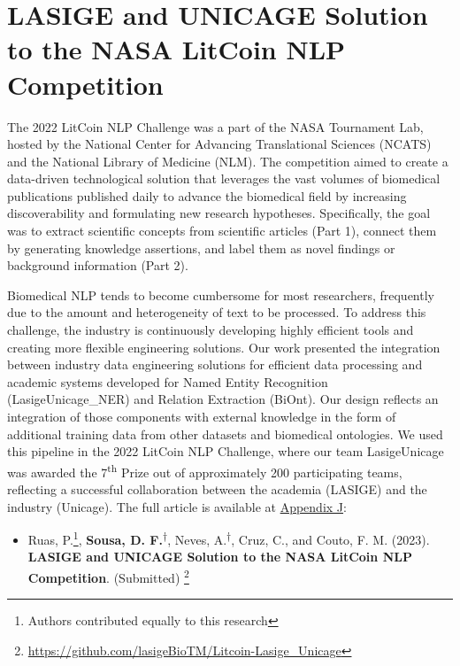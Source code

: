 \section{LASIGE and UNICAGE Solution to the NASA LitCoin NLP Competition}

The 2022 LitCoin NLP Challenge was a part of the NASA Tournament Lab, hosted by the National Center for Advancing Translational Sciences (NCATS) and the National Library of Medicine (NLM). The competition aimed to create a data-driven technological solution that leverages the vast volumes of biomedical publications published daily to advance the biomedical field by increasing discoverability and formulating new research hypotheses. Specifically, the goal was to extract scientific concepts from scientific articles (Part 1), connect them by generating knowledge assertions, and label them as novel findings or background information (Part 2). 

Biomedical NLP tends to become cumbersome for most researchers, frequently due to the amount and heterogeneity of text to be processed. To address this challenge, the industry is continuously developing highly efficient tools and creating more flexible engineering solutions. Our work presented the integration between industry data engineering solutions for efficient data processing and academic systems developed for Named Entity Recognition (LasigeUnicage\_NER) and Relation Extraction (BiOnt). Our design reflects an integration of those components with external knowledge in the form of additional training data from other datasets and biomedical ontologies. We used this pipeline in the 2022 LitCoin NLP Challenge, where our team LasigeUnicage was awarded the 7\textsuperscript{th} Prize out of approximately 200 participating teams, reflecting a successful collaboration between the academia (LASIGE) and the industry (Unicage). The full article is available at \hyperlink{AJ}{Appendix J}:

\begin{itemize}[label=]
    \item{Ruas, P.\footnote[†]{Authors contributed equally to this research}, \textbf{Sousa, D. F.}\textsuperscript{†}, Neves, A.\textsuperscript{†}, Cruz, C., and Couto, F. M. (2023). \textbf{LASIGE and UNICAGE Solution to the NASA LitCoin NLP Competition}. (Submitted)} \footnote{\url{https://github.com/lasigeBioTM/Litcoin-Lasige_Unicage}}
\end{itemize}


